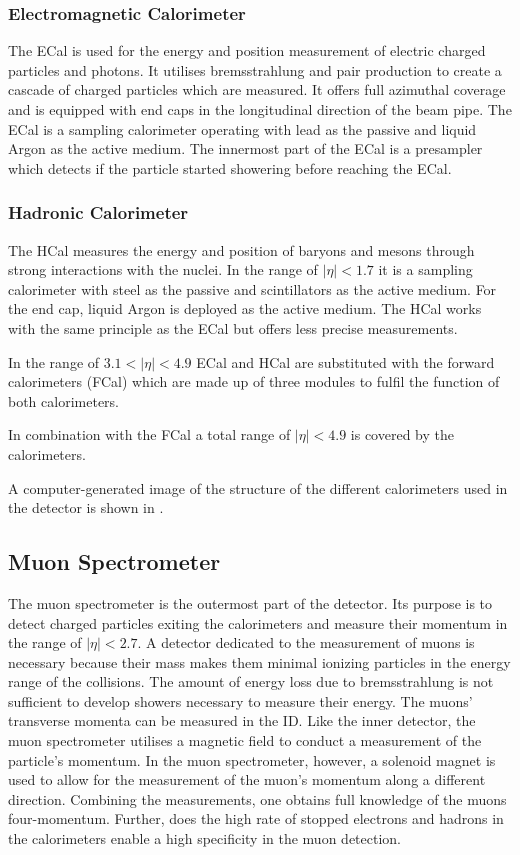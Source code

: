 \subsubsection{Electromagnetic Calorimeter}
The ECal is used for the energy and position measurement of electric charged particles and photons. It utilises bremsstrahlung and pair production to create a cascade of charged particles which are measured. It offers full azimuthal coverage and is equipped with end caps in the longitudinal direction of the beam pipe. The \atlas ECal is a sampling calorimeter operating with lead as the passive and liquid Argon as the active medium. The innermost part of the ECal is a presampler which detects if the particle started showering before reaching the ECal.
\subsubsection{Hadronic Calorimeter}
The HCal measures the energy and position of baryons and mesons through strong interactions with the nuclei. In the range of $|\eta|<1.7$ it is a sampling calorimeter with steel as the passive and scintillators as the active medium. For the end cap, liquid Argon is deployed as the active medium. The HCal works with the same principle as the ECal but offers less precise measurements.

In the range of $3.1<|\eta|<4.9$ ECal and HCal are substituted with the forward calorimeters (FCal) which are made up of three modules to fulfil the function of both calorimeters.

In combination with the FCal a total range of $|\eta|<4.9$ is covered by the calorimeters.

A computer-generated image of the structure of the different calorimeters used in the \atlas detector is shown in .
\subsection{Muon Spectrometer}
The muon spectrometer is the outermost part of the \atlas detector. Its purpose is to detect charged particles exiting the calorimeters and measure their momentum in the range of $|\eta|<2.7$. A detector dedicated to the measurement of muons is necessary because their mass makes them minimal ionizing particles in the energy range of the \lhc collisions. The amount of energy loss due to bremsstrahlung is not sufficient to develop showers necessary to measure their energy. The muons' transverse momenta can be measured in the ID. Like the inner detector, the muon spectrometer utilises a magnetic field to conduct a measurement of the particle's momentum.  In the muon spectrometer, however, a solenoid magnet is used to allow for the measurement of the muon's momentum along a different direction. Combining the measurements, one obtains full knowledge of the muons four-momentum. Further, does the high rate of stopped electrons and hadrons in the calorimeters enable a high specificity in the muon detection.


